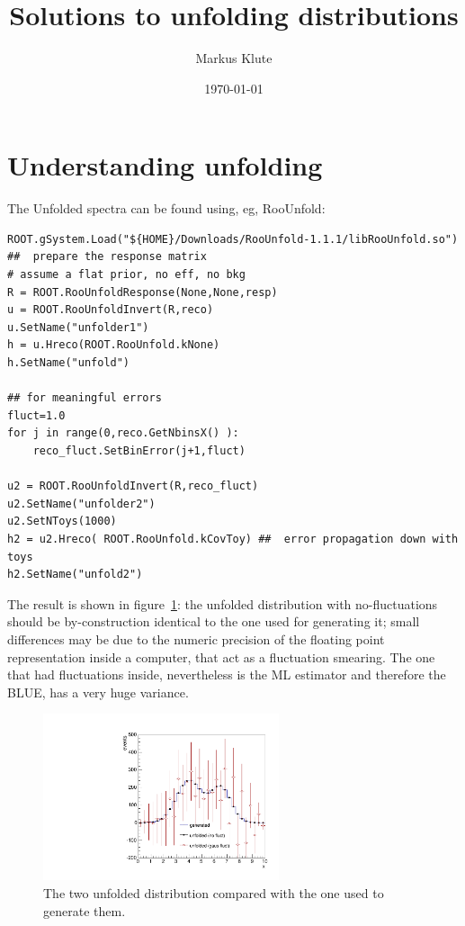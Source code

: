 \documentclass[a4paper,11pt]{article}
\title{Solutions to unfolding distributions}
\author{Markus Klute}
\date{\today}
\begin{document}
\maketitle

\section{Understanding unfolding}

The Unfolded spectra can be found using, eg, RooUnfold:
\begin{verbatim}
ROOT.gSystem.Load("${HOME}/Downloads/RooUnfold-1.1.1/libRooUnfold.so")
##  prepare the response matrix
# assume a flat prior, no eff, no bkg
R = ROOT.RooUnfoldResponse(None,None,resp)
u = ROOT.RooUnfoldInvert(R,reco)
u.SetName("unfolder1")
h = u.Hreco(ROOT.RooUnfold.kNone) 
h.SetName("unfold")

## for meaningful errors
fluct=1.0
for j in range(0,reco.GetNbinsX() ):
	reco_fluct.SetBinError(j+1,fluct)

u2 = ROOT.RooUnfoldInvert(R,reco_fluct)
u2.SetName("unfolder2")
u2.SetNToys(1000)
h2 = u2.Hreco( ROOT.RooUnfold.kCovToy) ##  error propagation down with toys
h2.SetName("unfold2")

\end{verbatim}

The result is shown in figure~\ref{fig:sol1}: the unfolded distribution with no-fluctuations should be by-construction identical to the one used for generating it; 
small differences may be due to the numeric precision of the floating point representation inside a computer, that act as a fluctuation smearing. 
The one that had fluctuations inside, nevertheless is the \gls{ML} estimator and therefore the \gls{BLUE}, has a very huge variance.

\begin{figure}[H]
	\centering
	\includegraphics[width=0.618\textwidth]{figs/gen-unfold.pdf}
	\caption{ \label{fig:sol1} The two unfolded distribution compared with the one used to generate them.}
\end{figure}
\end{document}
